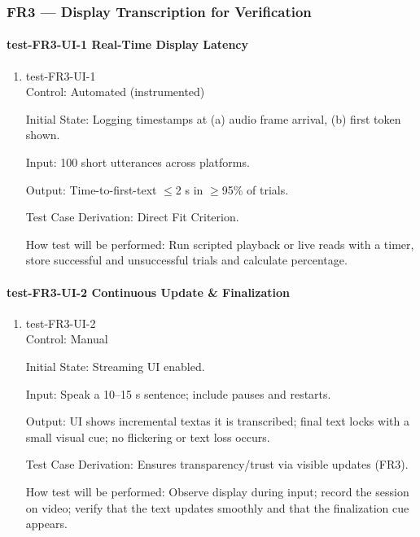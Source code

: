 \documentclass[12pt, titlepage]{article}
\begin{document}
\subsubsection{FR3 — Display Transcription for Verification}

\paragraph{test-FR3-UI-1 Real-Time Display Latency}

\begin{enumerate}
\item{test-FR3-UI-1\\}
Control: Automated (instrumented)

Initial State: Logging timestamps at (a) audio frame arrival, (b) first token shown.

Input: 100 short utterances across platforms.

Output: Time-to-first-text $\leq$2 s in $\geq$95\% of trials.

Test Case Derivation: Direct Fit Criterion.

How test will be performed: Run scripted playback or live reads with a timer, store successful and unsuccessful trials and calculate percentage.
\end{enumerate}

\paragraph{test-FR3-UI-2 Continuous Update \& Finalization}

\begin{enumerate}
\item{test-FR3-UI-2\\}
Control: Manual

Initial State: Streaming UI enabled.

Input: Speak a 10–15 s sentence; include pauses and restarts.

Output: UI shows incremental textas it is transcribed; final text locks with a small visual cue; no flickering or text loss occurs.

Test Case Derivation: Ensures transparency/trust via visible updates (FR3).

How test will be performed: Observe display during input; record the session on video; verify that the text updates smoothly and that the finalization cue appears.
\end{enumerate}
\end{document}
